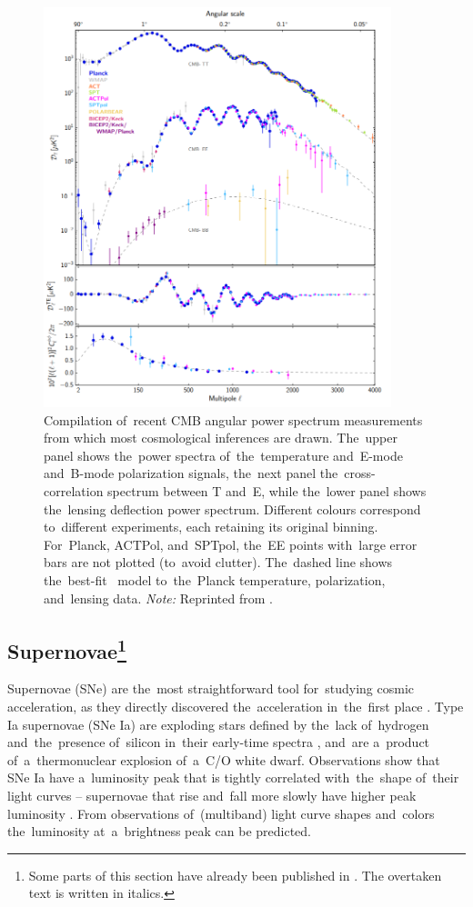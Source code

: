 \begin{figure}[!hbt]
    \centering
    \includegraphics[width=0.9\textwidth]{cosmo_evol/CMB_compilation.png}
    \caption{Compilation of~recent CMB angular power spectrum measurements from which most cosmological inferences are drawn. The~upper panel shows the~power spectra of~the~temperature and~E-mode and~B-mode polarization signals, the~next panel the~cross-correlation spectrum between T and~E, while the~lower panel shows the~lensing deflection power spectrum. Different colours correspond to~different experiments, each retaining its original binning. For~Planck, ACTPol, and~SPTpol, the~EE points with~large error bars are not plotted (to~avoid clutter). The~dashed line shows the~best-fit \LCDM\ model to~the~Planck temperature, polarization, and~lensing data. \textit{Note:} Reprinted from \textcite{2018arXiv180706205P}.}
    \label{fig:cmb_compilation}
\end{figure}
\subsection[Supernovae]{Supernovae\footnote{\label{ftn1}Some parts of this section have already been published in \textcite{mastersthesis_vrastil}. The overtaken text is written in italics.}}
\label{ssec:supernovae}
Supernovae (SNe) are the~most straightforward tool for~studying cosmic acceleration, as they directly discovered the~acceleration in~the~first place \parencite{riess}. Type Ia supernovae (SNe Ia) are exploding stars defined by the~lack of~hydrogen and~the~presence of~silicon in~their early-time spectra \parencite{SN}, and~are a~product of~a~thermonuclear explosion of~a~C/O white dwarf. Observations show that SNe Ia have a~luminosity peak that is tightly correlated with~the~shape of~their light curves -- supernovae that rise and~fall more slowly have higher peak luminosity \parencite[first quantified by][]{SN_lum}. From observations of~(multiband) light curve shapes and~colors the~luminosity at~a~brightness peak can be predicted.

